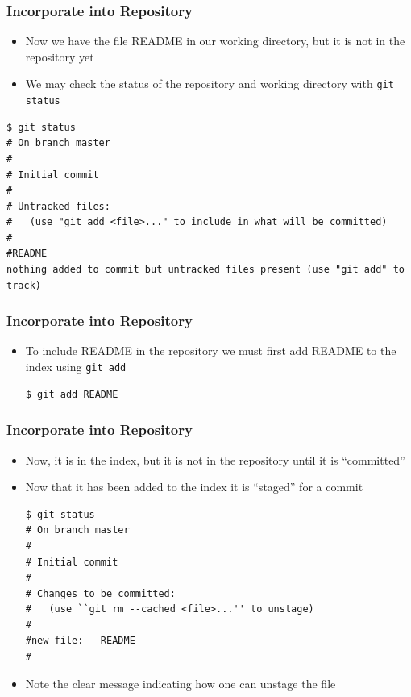 \documentclass[handout,13pt,compress,c]{beamer}
\newcommand{\bi}{\begin{itemize}}
\newcommand{\ei}{\end{itemize}}
\begin{document}
\begin{frame}[fragile]
\frametitle{Incorporate into Repository}
\bi
\item Now we have the file README in our working directory, but it is not in the repository yet
\item We may check the status of the repository and working directory with \texttt{git status}
\ei
\begin{semiverbatim}
\begin{lstlisting}
$ git status
# On branch master
#
# Initial commit
#
# Untracked files:
#   (use "git add <file>..." to include in what will be committed)
#
#README
nothing added to commit but untracked files present (use "git add" to track)
\end{lstlisting}
\end{semiverbatim}

\end{frame}
\begin{frame}[fragile]
\frametitle{Incorporate into Repository}
\bi
\item To include README in the repository we must first add README to the index using \texttt{git add}
\begin{semiverbatim}
\begin{lstlisting}
$ git add README
\end{lstlisting}
\end{semiverbatim}
\ei
\end{frame}
\begin{frame}[fragile]
\frametitle{Incorporate into Repository}
\bi
\item Now, it is in the index, but it is not in the repository until it is ``committed''
\item Now that it has been added to the index it is ``staged'' for a commit
\begin{semiverbatim}
\begin{lstlisting}
$ git status
# On branch master
#
# Initial commit
#
# Changes to be committed:
#   (use ``git rm --cached <file>...'' to unstage)
#
#new file:   README
#
\end{lstlisting}
\end{semiverbatim}
\item Note the clear message indicating how one can unstage the file
\ei
\end{frame}
\end{document}
